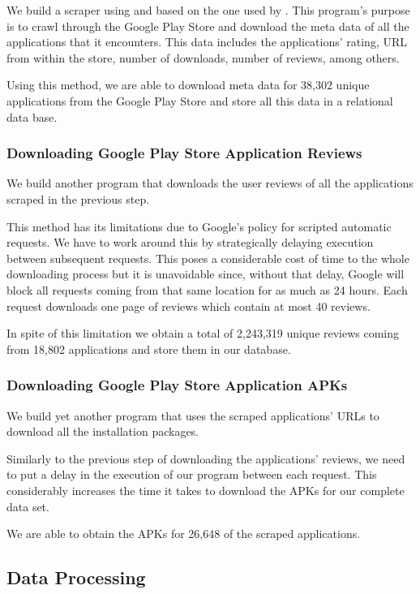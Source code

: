 \documentclass{sig-alternate}
\begin{document}
We build a scraper using \cite{scrapy} and based on the one used by \cite{googleplay_scraper}. This program's purpose is to crawl through the Google Play Store and download the meta data of all the applications that it encounters. This data includes the applications' rating, URL from within the store, number of downloads, number of reviews, among others.

Using this method, we are able to download meta data for 38,302 unique applications from the Google Play Store and store all this data in a relational data base.

\subsubsection{Downloading Google Play Store Application Reviews}

We build another program that downloads the user reviews of all the applications scraped in the previous step.

This method has its limitations due to Google's policy for scripted automatic requests. We have to work around this by strategically delaying execution between subsequent requests. This poses a considerable cost of time to the whole downloading process but it is unavoidable since, without that delay, Google will block all requests coming from that same location for as much as 24 hours. Each request downloads one page of reviews which contain at most 40 reviews.

In spite of this limitation we obtain a total of 2,243,319 unique reviews coming from 18,802 applications and store them in our database.

\subsubsection{Downloading Google Play Store Application APKs}

We build yet another program that uses the scraped applications' URLs to download all the installation packages.

Similarly to the previous step of downloading the applications' reviews, we need to put a delay in the execution of our program between each request. This considerably increases the time it takes to download the APKs for our complete data set.

We are able to obtain the APKs for 26,648 of the scraped applications.

\subsection{Data Processing}
\end{document}
